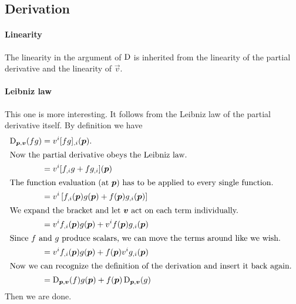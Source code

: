 \documentclass[11pt, english, fleqn, DIV=15, headinclude, BCOR=1cm]{scrartcl}
\begin{document}
\subsection{Derivation}

\paragraph{Linearity}

The linearity in the argument of $\mathop{}\!\mathrm D$ is inherited from the linearity of the
partial derivative and the linearity of $\vec v$.

\paragraph{Leibniz law}

This one is more interesting. It follows from the Leibniz law of the partial
derivative itself. By definition we have
\begin{align*}
    \Dif_{\vec p, \vec v}(f g)
    &= v^i [fg]_{,i}(\vec p). \\
    \intertext{%
        Now the partial derivative obeys the Leibniz law.
    }
    &= v^i [f_{,i}g + fg_{,i}](\vec p) \\
    \intertext{%
        The function evaluation (at $\vec p$) has to be applied to every single
        function.
    }
    &= v^i \sbr{f_{,i}(\vec p) g(\vec p) + f(\vec p) g_{,i}(\vec p)} \\
    \intertext{%
        We expand the bracket and let $\vec v$ act on each term individually.
    }
    &= v^i f_{,i}(\vec p) g(\vec p) + v^i f(\vec p) g_{,i}(\vec p) \\
    \intertext{%
        Since $f$ and $g$ produce scalars, we can move the terms around like we
        wish.
    }
    &= v^i f_{,i}(\vec p) g(\vec p) + f(\vec p) v^i g_{,i}(\vec p) \\
    \intertext{%
        Now we can recognize the definition of the derivation and insert it
        back again.
    }
    &= \Dif_{\vec p, \vec v}(f) g(\vec p) + f(\vec p) \Dif_{\vec p, \vec v}(g)
\end{align*}
Then we are done.
\end{document}
